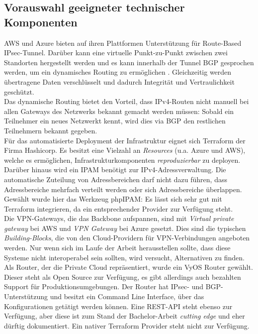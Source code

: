 \subsection{Vorauswahl geeigneter technischer Komponenten}
AWS und Azure bieten auf ihren Plattformen Unterstützung für Route-Based IPsec-Tunnel\cite[S.32]{awsvpn2021}. Darüber kann eine virtuelle Punkt-zu-Punkt zwischen zwei Standorten hergestellt werden und es kann innerhalb der Tunnel BGP gesprochen werden, um ein dynamisches Routing zu ermöglichen\cite[S. 18]{AlShawi2020} \cite[S. 74-79]{Toroman2019}. Gleichzeitig werden übertragene Daten verschlüsselt und dadurch Integrität und Vertraulichkeit geschützt.\\
Das dynamische Routing bietet den Vorteil, dass IPv4-Routen nicht manuell bei allen Gateways des Netzwerks bekannt gemacht werden müssen: Sobald ein Teilnehmer ein neues Netzwerkt kennt, wird dies via BGP den restlichen Teilnehmern bekannt gegeben.\\
Für das automatisierte Deployment der Infrastruktur eignet sich Terraform der Firma Hashicorp. Es besitzt eine Vielzahl an \textit{Resources} (u.a. Azure und AWS), welche es ermöglichen, Infrastrukturkomponenten \textit{reproduzierbar} zu deployen.\\
Darüber hinaus wird ein IPAM benötigt zur IPv4-Adressverwaltung. Die automatische Zuteilung von Adressbereichen darf nicht dazu führen, dass Adressbereiche mehrfach verteilt werden oder sich Adressbereiche überlappen. Gewählt wurde hier das Werkzeug phpIPAM\cite{phpipam2020}: Es lässt sich sehr gut mit Terraform integrieren, da ein entsprechender Provider zur Verfügung steht\cite{phpipamtf2020}.\\
Die VPN-Gateways, die das Backbone aufspannen, sind mit \textit{Virtual private gateway} bei AWS und \textit{VPN Gateway} bei Azure gesetzt. Dies sind die typischen \textit{Building-Blocks}, die von den Cloud-Providern für VPN-Verbindungen angeboten werden. Nur wenn sich im Laufe der Arbeit herausstellen sollte, dass diese Systeme nicht interoperabel sein sollten, wird versucht, Alternativen zu finden.\\
Als Router, der die Private Cloud repräsentiert, wurde ein VyOS Router gewählt. Dieser steht als Open Source zur Verfügung, es gibt allerdings auch bezahlten Support für Produktionsumgebungen. Der Router hat IPsec- und BGP-Unterstützung und besitzt ein Command Line Interface, über das Konfigurationen getätigt werden können. Eine REST-API steht ebenso zur Verfügung, aber diese ist zum Stand der Bachelor-Arbeit \textit{cutting edge} und eher dürftig dokumentiert\cite{vyosapi2021}. Ein nativer Terraform Provider steht nicht zur Verfügung.
